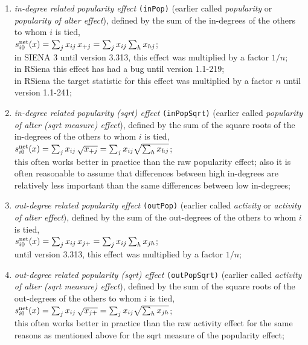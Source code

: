 \documentclass[a4paper,fleqn,11pt]{article}
\newcommand{\+}{\, + \,}
\newcommand{\vit}{\theenumi}
\newcommand{\RS}{{\sf RSiena }}
\newcommand{\SI}{{\sf SIENA }}
\begin{document}
\begin{enumerate}
 \item {\em in-degree related popularity effect} \texttt{(inPop)}
 (earlier called {\em popularity} or {\em popularity of alter effect}), defined by
  the sum of
 the in-degrees of the others to whom $i$ is tied,\\
 $s^{\rm net}_{i\vit}(x) =  \sum_j x_{ij}\, x_{+j} =
 \sum_j x_{ij} \sum_h x_{hj} $;\\
 in \SI 3 until version 3.313, this effect was multiplied by a factor $1/n$;\\
 in \RS this effect has had a bug until version 1.1-219;\\
 in \RS the target statistic for this effect was multiplied by a factor $n$ until version 1.1-241;

 \item {\em in-degree related popularity (sqrt) effect} \texttt{(inPopSqrt)}
 (earlier called {\em popularity of alter (sqrt measure) effect}), defined by the sum of
 the square roots of the in-degrees of the others to whom $i$ is tied,\\
 $s^{\rm net}_{i\vit}(x) = \sum_j x_{ij}\, \sqrt{x_{+j}} =
  \sum_j x_{ij} \sqrt{\sum_h x_{hj}} $;\\
 this often works better in practice than the raw popularity effect;
 also it is often reasonable to assume that differences between high in-degrees are
 relatively less important than the same differences between low
 in-degrees;

 \item {\em out-degree related popularity effect} \texttt{(outPop)}
 (earlier called {\em activity} or {\em activity of alter effect}), defined by
  the sum of the out-degrees
 of the others to whom $i$ is tied,\\
 $s^{\rm net}_{i\vit}(x) =  \sum_j x_{ij}\, x_{j+} =
  \sum_j x_{ij} \sum_h x_{jh} $; \\
 until version 3.313, this effect was multiplied by a factor $1/n$;


 \item {\em out-degree related popularity (sqrt) effect} \texttt{(outPopSqrt)}
 (earlier called {\em activity of alter (sqrt measure) effect}), defined by the sum of
 the square roots of the out-degrees of the others to whom $i$ is tied,\\
 $s^{\rm net}_{i\vit}(x) = \sum_j x_{ij}\, \sqrt{x_{j+}} =
  \sum_j x_{ij} \sqrt{\sum_h x_{jh}} $;\\
 this often works better in practice than the raw activity effect
 for the same reasons as mentioned above for the sqrt measure of the popularity effect;



\end{enumerate}
\end{document}
